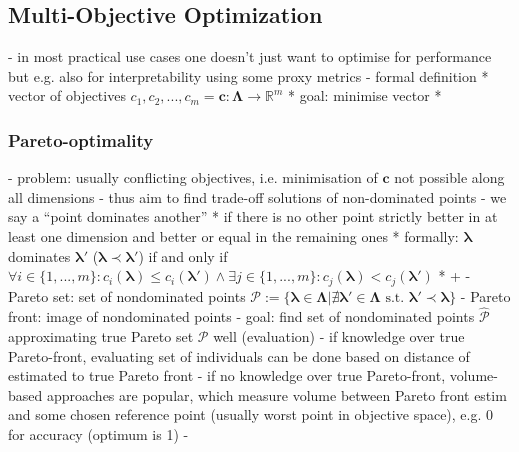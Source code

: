 \documentclass[twoside,11pt]{article}
\begin{document}
\subsection{Multi-Objective Optimization}
- in most practical use cases one doesn't just want to optimise for performance but e.g. also for interpretability using some proxy metrics
- formal definition
  * vector of objectives $c_1,c_2,...,c_m=\boldsymbol{c}:\boldsymbol\Lambda\rightarrow\mathbb{R}^m$
  * goal: minimise vector
  * \citep[p. 11]{10.1145/3610536}
\subsubsection{Pareto-optimality}
- problem: usually conflicting objectives, i.e. minimisation of $\boldsymbol{c}$ not possible along all dimensions
- thus aim to find trade-off solutions of non-dominated points
- we say a ``point dominates another''
  * if there is no other point strictly better in at least one dimension and better or equal in the remaining ones
  * formally: $\boldsymbol\lambda$ dominates $\boldsymbol\lambda'$ ($\boldsymbol\lambda\prec\boldsymbol\lambda'$) if and only if
    $\forall i\in\{1,...,m\}:c_i(\boldsymbol\lambda) \le c_i(\boldsymbol\lambda') \wedge \exists j\in\{1,...,m\}:c_j(\boldsymbol\lambda) < c_j(\boldsymbol\lambda')$
  * \citep[pp. 7f]{10.1145/3610536} + \citep[pp. 198f]{genetic_algos}
- Pareto set: set of nondominated points $\mathcal{P}:=\{\boldsymbol\lambda\in\boldsymbol\Lambda|\nexists\boldsymbol\lambda'\in\boldsymbol\Lambda\text{ s.t. }\boldsymbol\lambda'\prec\boldsymbol\lambda\}$
- Pareto front: image of nondominated points
- goal: find set of nondominated points $\hat{\mathcal{P}}$ approximating true Pareto set $\mathcal{P}$ well
(evaluation)
- if knowledge over true Pareto-front, evaluating set of individuals can be done based on distance of estimated to true Pareto front
- if no knowledge over true Pareto-front, volume-based approaches are popular, which measure volume between Pareto front estim and some chosen
  reference point (usually worst point in objective space), e.g. 0 for accuracy (optimum is 1)
- \citep[pp. 8-10]{10.1145/3610536}
\end{document}
